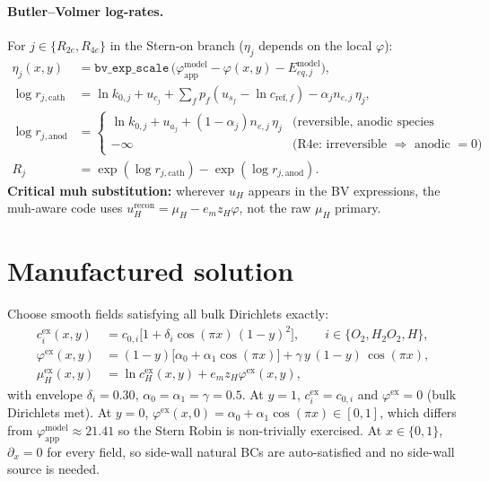 \documentclass[11pt]{article}
\newcommand{\app}{\mathrm{app}}
\newcommand{\modl}{\mathrm{model}}
\begin{document}
\paragraph{Butler--Volmer log-rates.} For $j \in \{R_{2e}, R_{4e}\}$ in the
Stern-on branch ($\eta_j$ depends on the local $\varphi$):
\begin{align}
  \eta_j(x,y)
  &= \mathtt{bv\_exp\_scale}\, \bigl(\varphi_\app^\modl - \varphi(x,y) - E_{eq,j}^\modl\bigr), \\
  \log r_{j,\mathrm{cath}}
  &= \ln k_{0,j} + u_{c_j} + \sum_f p_f (u_{s_f} - \ln c_{\mathrm{ref},f})
                  - \alpha_j n_{e,j}\, \eta_j, \\
  \log r_{j,\mathrm{anod}}
  &= \begin{cases}
       \ln k_{0,j} + u_{a_j} + (1{-}\alpha_j) n_{e,j}\, \eta_j
         & \text{(reversible, anodic species defined)} \\
       -\infty
         & \text{(R4e: irreversible $\Rightarrow$ anodic $=0$)}
     \end{cases} \\
  R_j &= \exp(\log r_{j,\mathrm{cath}}) - \exp(\log r_{j,\mathrm{anod}}).
\end{align}
\textbf{Critical muh substitution:} wherever $u_H$ appears in the BV
expressions, the muh-aware code uses $u_H^\mathrm{recon} = \mu_H - e_m z_H \varphi$,
not the raw $\mu_H$ primary.

\section{Manufactured solution}

Choose smooth fields satisfying all bulk Dirichlets exactly:
\begin{align}
  c_i^\mathrm{ex}(x,y) &= c_{0,i}\bigl[1 + \delta_i \cos(\pi x)\, (1-y)^2\bigr],
    \qquad i \in \{O_2, H_2O_2, H\}, \\
  \varphi^\mathrm{ex}(x,y) &= (1-y)\bigl[\alpha_0 + \alpha_1 \cos(\pi x)\bigr]
    + \gamma\, y\, (1-y)\, \cos(\pi x), \\
  \mu_H^\mathrm{ex}(x,y) &= \ln c_H^\mathrm{ex}(x,y) + e_m z_H \varphi^\mathrm{ex}(x,y),
\end{align}
with envelope $\delta_i = 0.30$, $\alpha_0 = \alpha_1 = \gamma = 0.5$. At $y=1$,
$c_i^\mathrm{ex} = c_{0,i}$ and $\varphi^\mathrm{ex} = 0$ (bulk
Dirichlets met). At $y=0$, $\varphi^\mathrm{ex}(x,0) = \alpha_0 + \alpha_1
\cos(\pi x) \in [0,1]$, which differs from $\varphi_\app^\modl \approx 21.41$
so the Stern Robin is non-trivially exercised. At $x \in \{0,1\}$,
$\partial_x = 0$ for every field, so side-wall natural BCs are auto-satisfied
and no side-wall source is needed.
\end{document}
